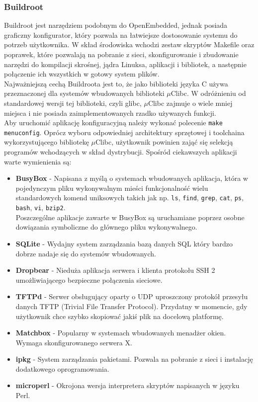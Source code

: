 \documentclass[a4paper,12pt]{book}
\begin{document}
				\subsubsection{Buildroot}
					Buildroot jest narzędziem podobnym do OpenEmbedded, jednak posiada graficzny konfigurator, który pozwala na łatwiejsze dostosowanie systemu do potrzeb użytkownika. W skład środowiska wchodzi zestaw skryptów Makefile oraz poprawek, które pozwalają na pobranie z sieci, skonfigurowanie i zbudowanie narzędzi do kompilacji skrośnej, jądra Linuksa, aplikacji i bibliotek, a następnie połączenie ich wszystkich w gotowy system plików.\\
					Najważniejszą cechą Buildroota jest to, że jako biblioteki języka C używa przeznaczonej dla systemów wbudowanych biblioteki $\mu$Clibc. W odróżnieniu od standardowej wersji tej biblioteki, czyli glibc, $\mu$Clibc zajmuje o wiele mniej miejsca i nie posiada zaimplementowanych rzadko używanych funkcji.\\
					Aby uruchomić aplikację konfiguracyjną należy wykonać polecenie \texttt{make menuconfig}. Oprócz wyboru odpowiedniej architektury sprzętowej i toolchaina wykorzystującego bibliotekę $\mu$Clibc, użytkownik powinien zająć się selekcją programów wchodzących w skład dystrybucji. Spośród ciekawszych aplikacji warte wymienienia są:
					\begin{itemize}
						\item \textbf{BusyBox} - Napisana z myślą o systemach wbudowanych aplikacja, która w pojedynczym pliku wykonywalnym mieści funkcjonalność wielu standardowych komend uniksowych takich jak np. \texttt{ls}, \texttt{find}, \texttt{grep}, \texttt{cat}, \texttt{ps}, \texttt{bash}, \texttt{vi}, \texttt{bzip2}.\\
							Poszczególne aplikacje zawarte w BusyBox są uruchamiane poprzez osobne dowiązania symboliczne do głównego pliku wykonywalnego.
						\item \textbf{SQLite} - Wydajny system zarządzania bazą danych SQL który bardzo dobrze nadaje się do systemów wbudowanych.
						\item \textbf{Dropbear} - Nieduża aplikacja serwera i klienta protokołu SSH 2 umożliwiającego bezpieczne połączenia sieciowe.
						\item \textbf{TFTPd} - Serwer obsługujący oparty o UDP uproszczony protokół przesyłu danych TFTP (Trivial File Transfer Protocol). Przydatny w momencie, gdy użytkownik chce szybko skopiować jakiś plik na docelową platformę.
						\item \textbf{Matchbox} - Popularny w systemach wbudowanych menadżer okien. Wymaga skonfigurowanego serwera X.
						\item \textbf{ipkg} - System zarządzania pakietami. Pozwala na pobranie z sieci i instalację dodatkowego oprogramowania.
						\item \textbf{microperl} - Okrojona wersja interpretera skryptów napisanych w języku Perl.
					\end{itemize}
\end{document}
